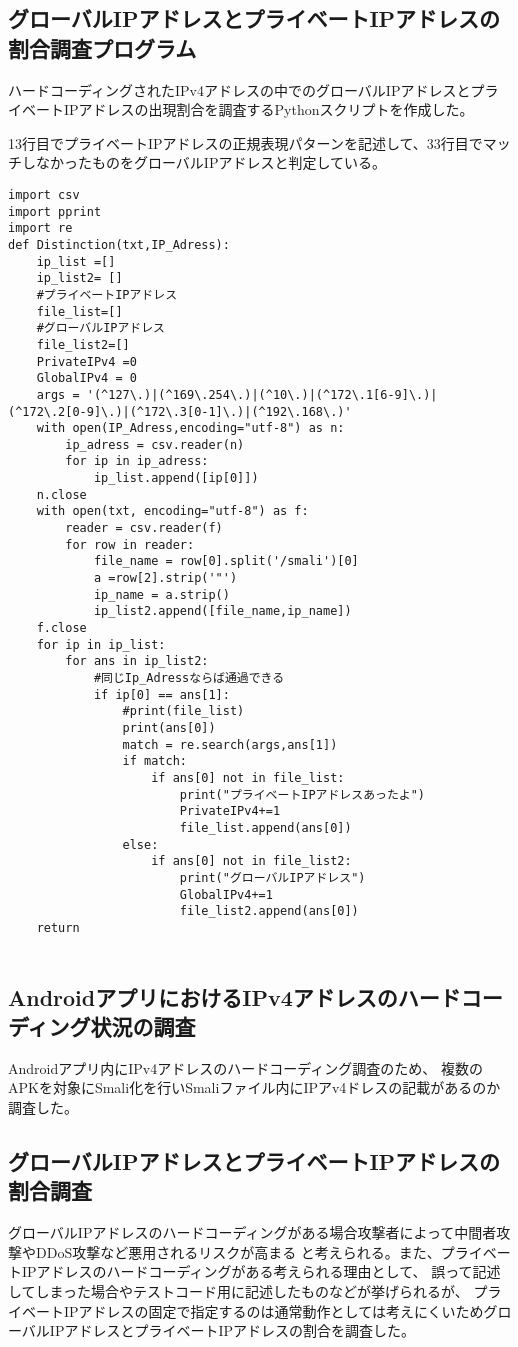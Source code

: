 \documentclass[a4j]{jarticle}
\begin{document}
\subsection{グローバルIPアドレスとプライベートIPアドレスの割合調査プログラム}
ハードコーディングされたIPv4アドレスの中でのグローバルIPアドレスとプライベートIPアドレスの出現割合を調査するPythonスクリプトを作成した。

13行目でプライベートIPアドレスの正規表現パターンを記述して、33行目でマッチしなかったものをグローバルIPアドレスと判定している。

\begin{lstlisting}[caption=ハードコーディングされたIPv4アドレスの中でのグローバルIPアドレスとプライベートIPアドレスの出現割合を調査するPythonスクリプト]
import csv
import pprint
import re
def Distinction(txt,IP_Adress):
	ip_list =[]
	ip_list2= []
	#プライベートIPアドレス
	file_list=[]
	#グローバルIPアドレス
	file_list2=[]
	PrivateIPv4 =0
	GlobalIPv4 = 0
	args = '(^127\.)|(^169\.254\.)|(^10\.)|(^172\.1[6-9]\.)|(^172\.2[0-9]\.)|(^172\.3[0-1]\.)|(^192\.168\.)'
	with open(IP_Adress,encoding="utf-8") as n:
		ip_adress = csv.reader(n)
		for ip in ip_adress:
			ip_list.append([ip[0]])
	n.close
	with open(txt, encoding="utf-8") as f:
		reader = csv.reader(f)
		for row in reader:
			file_name = row[0].split('/smali')[0]
			a =row[2].strip('"')
			ip_name = a.strip()
			ip_list2.append([file_name,ip_name])
	f.close
	for ip in ip_list:
		for ans in ip_list2:
			#同じIp_Adressならば通過できる
			if ip[0] == ans[1]:
				#print(file_list)
				print(ans[0])
				match = re.search(args,ans[1])
				if match:
					if ans[0] not in file_list:
						print("プライベートIPアドレスあったよ")
						PrivateIPv4+=1
						file_list.append(ans[0])
				else:
					if ans[0] not in file_list2:
						print("グローバルIPアドレス")
						GlobalIPv4+=1
						file_list2.append(ans[0])
	return
	
\end{lstlisting}

\subsection{AndroidアプリにおけるIPv4アドレスのハードコーディング状況の調査}
Androidアプリ内にIPv4アドレスのハードコーディング調査のため、
複数のAPKを対象にSmali化を行いSmaliファイル内にIPアv4ドレスの記載があるのか調査した。


\subsection{グローバルIPアドレスとプライベートIPアドレスの割合調査}
グローバルIPアドレスのハードコーディングがある場合攻撃者によって中間者攻撃やDDoS攻撃など悪用されるリスクが高まる
と考えられる。また、プライベートIPアドレスのハードコーディングがある考えられる理由として、
誤って記述してしまった場合やテストコード用に記述したものなどが挙げられるが、
プライベートIPアドレスの固定で指定するのは通常動作としては考えにくいためグローバルIPアドレスとプライベートIPアドレスの割合を調査した。
\end{document}
